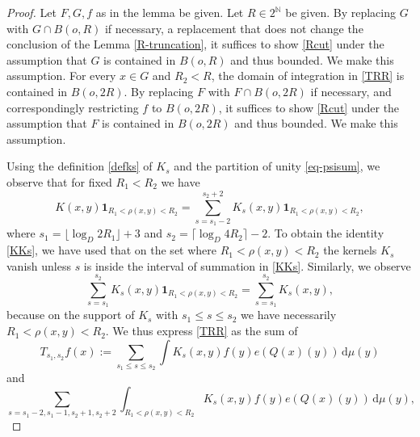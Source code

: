\documentclass[10pt,a4paper]{article}
\theoremstyle{plain}
\theoremstyle{definition}
\numberwithin{equation}{subsection}
\newcommand{\N}{{\mathbb{N}}}
\newcommand{\leanok}{}
\begin{document}
\begin{proof}
\leanok
Let $F,G,f$ as in the lemma be given. Let $R\in 2^\N$ be given.
By replacing $G$ with $G\cap B(o,R)$ if necessary, a replacement that does not change the conclusion of the Lemma \ref{R-truncation}, it suffices to show \eqref{Rcut} under the assumption that $G$ is contained in $B(o,R)$ and thus bounded. We make this assumption. For every $x\in G$ and $R_2 < R$, the domain of integration in \eqref{TRR} is contained in $B(o,2R)$. By replacing $F$ with $F\cap B(o,2R)$ if necessary, and correspondingly restricting $f$ to $B(o, 2R)$, it suffices to show \eqref{Rcut} under the assumption that $F$ is contained in $B(o,2R)$ and thus bounded. We make this assumption.

Using the definition \eqref{defks} of $K_s$ and the partition of unity \eqref{eq-psisum},
we observe that
for fixed $R_1<R_2$ we have
\begin{equation}
    \label{KKs}
    K(x,y)\mathbf{1}_{R_1<\rho(x,y)<R_2}=\sum_{s=s_1-2}^{s_2+2} K_s(x,y) \mathbf{1}_{R_1<\rho(x,y)<R_2},
\end{equation}
where $s_1=\lfloor\log_D 2R_1\rfloor+3$ and $s_2=\lceil\log_D 4R_2\rceil-2$.
To obtain the identity \eqref{KKs}, we have used that on the set where $R_1<\rho(x,y)<R_2$ the kernels $K_s$ vanish unless $s$ is inside the interval of summation in \eqref{KKs}. Similarly, we observe
\begin{equation}
    \label{KsrhoKs}
    \sum_{s=s_1}^{s_2} K_s(x,y) \mathbf{1}_{R_1<\rho(x,y)<R_2} = \sum_{s=s_1}^{s_2} K_s(x,y),
\end{equation}
because on the support of $K_s$ with $s_1\le s\le s_2$ we have necessarily $R_1<\rho(x,y)<R_2$. We thus express \eqref{TRR} as the sum of
\begin{equation}\label{middles}
T_{s_1,s_2}f(x):=\sum_{s_1 \le s\le s_2}
\int K_s(x,y) f(y) e(Q(x)(y)) \, \mathrm{d}\mu(y)
\end{equation}
and
\begin{equation}\label{boundarys}
\sum_{s=s_1-2,s_1-1, s_2+1, s_2+2}
\int_{R_1 < \rho(x,y) < R_2} K_s(x,y) f(y) e(Q(x)(y)) \,
 \mathrm{d}\mu(y),
\end{equation}


\end{proof}
\end{document}
